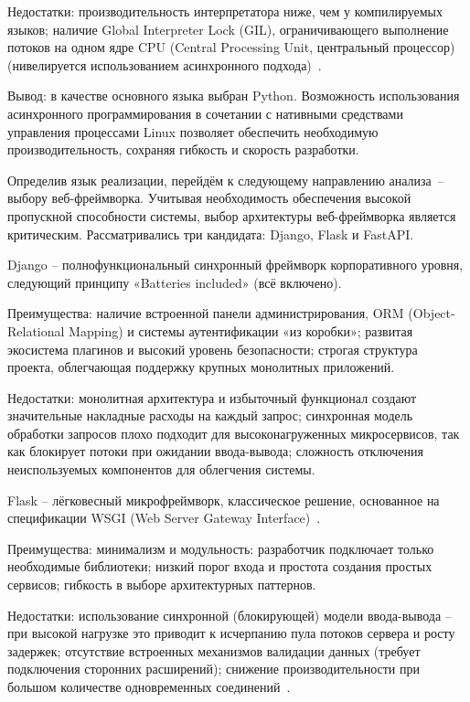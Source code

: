 Недостатки: производительность интерпретатора ниже, чем у компилируемых языков; наличие Global Interpreter Lock (GIL), ограничивающего выполнение потоков на одном ядре CPU (Central Processing Unit, центральный процессор) (нивелируется использованием асинхронного подхода)~\cite{beazley-gil,python-asyncio,beazley-python-cookbook}.

Вывод: в качестве основного языка выбран Python. Возможность использования асинхронного программирования в сочетании с нативными средствами управления процессами Linux позволяет обеспечить необходимую производительность, сохраняя гибкость и скорость разработки.


Определив язык реализации, перейдём к следующему направлению анализа~-- выбору веб-фреймворка. Учитывая необходимость обеспечения высокой пропускной способности системы, выбор архитектуры веб-фреймворка является критическим. Рассматривались три кандидата: Django, Flask и FastAPI.

Django -- полнофункциональный синхронный фреймворк корпоративного уровня, следующий принципу «Batteries included» (всё включено).

Преимущества: наличие встроенной панели администрирования, ORM (Object-Relational Mapping) и системы аутентификации «из коробки»; развитая экосистема плагинов и высокий уровень безопасности; строгая структура проекта, облегчающая поддержку крупных монолитных приложений.

Недостатки: монолитная архитектура и избыточный функционал создают значительные накладные расходы на каждый запрос; синхронная модель обработки запросов плохо подходит для высоконагруженных микросервисов, так как блокирует потоки при ожидании ввода-вывода; сложность отключения неиспользуемых компонентов для облегчения системы.

Flask -- лёгковесный микрофреймворк, классическое решение, основанное на спецификации WSGI (Web Server Gateway Interface)~\cite{greenberg-flask}.

Преимущества: минимализм и модульность: разработчик подключает только необходимые библиотеки; низкий порог входа и простота создания простых сервисов; гибкость в выборе архитектурных паттернов.

Недостатки: использование синхронной (блокирующей) модели ввода-вывода -- при высокой нагрузке это приводит к исчерпанию пула потоков сервера и росту задержек; отсутствие встроенных механизмов валидации данных (требует подключения сторонних расширений); снижение производительности при большом количестве одновременных соединений~\cite{kerrisk-linux}.


